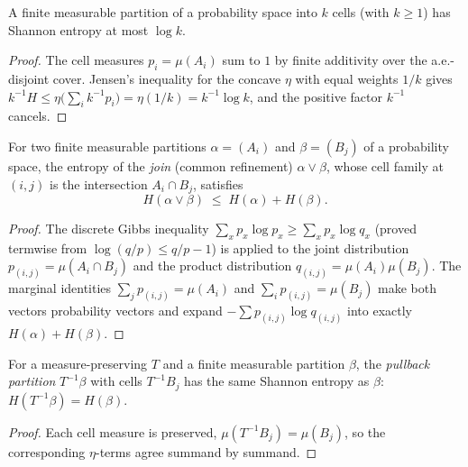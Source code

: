\begin{lemma}\label{entropy_le_log_card_partition}
  \leanok
  A finite measurable partition of a probability space into \(k\) cells (with \(k\ge 1\)) has
  Shannon entropy at most \(\log k\).
\end{lemma}
\begin{proof}\leanok
  The cell measures \(p_i=\mu(A_i)\) sum to \(1\) by finite additivity over the a.e.-disjoint
  cover. Jensen's inequality for the concave \(\eta\) with equal weights \(1/k\) gives
  \(k^{-1}H \le \eta\bigl(\sum_i k^{-1}p_i\bigr) = \eta(1/k) = k^{-1}\log k\), and the positive
  factor \(k^{-1}\) cancels.
\end{proof}

\begin{theorem}\label{entropy_join_le}
  \leanok
  For two finite measurable partitions \(\alpha=(A_i)\) and \(\beta=(B_j)\) of a probability
  space, the entropy of the \emph{join} (common refinement) \(\alpha\vee\beta\), whose cell
  family
  at \((i,j)\) is the intersection \(A_i\cap B_j\), satisfies
  \[
    H(\alpha\vee\beta) \;\le\; H(\alpha) + H(\beta).
  \]
\end{theorem}
\begin{proof}\leanok
  The discrete Gibbs inequality \(\sum_x p_x\log p_x \ge \sum_x p_x\log q_x\) (proved termwise
  from \(\log(q/p)\le q/p-1\)) is applied to the joint distribution \(p_{(i,j)}=\mu(A_i\cap B_j)\)
  and the product distribution \(q_{(i,j)}=\mu(A_i)\mu(B_j)\). The marginal identities
  \(\sum_j p_{(i,j)}=\mu(A_i)\) and \(\sum_i p_{(i,j)}=\mu(B_j)\) make both vectors probability
  vectors and expand \(-\sum p_{(i,j)}\log q_{(i,j)}\) into exactly \(H(\alpha)+H(\beta)\).
\end{proof}

\begin{lemma}\label{entropy_pullback}
  \leanok
  For a measure-preserving \(T\) and a finite measurable partition \(\beta\), the \emph{pullback
  partition} \(T^{-1}\beta\)
  with cells \(T^{-1}B_j\) has the same Shannon entropy as \(\beta\):
  \(H(T^{-1}\beta)=H(\beta)\).
\end{lemma}
\begin{proof}\leanok
  Each cell measure is preserved, \(\mu(T^{-1}B_j)=\mu(B_j)\), so the corresponding \(\eta\)-terms
  agree summand by summand.
\end{proof}

